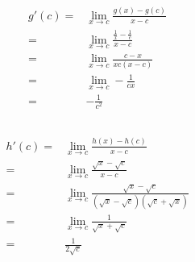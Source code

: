 \documentclass{article}
\begin{document}
        \subsection{}
            \paragraph{
                \begin{equation*}
                    \begin{split}
                        g'(c)=&\lim _{x\rightarrow c} \frac{g(x)-g(c)}{x-c}\\
                            =&\lim_{x\rightarrow c}\frac{\frac{1}{x}-\frac{1}{c}}{x-c}\\
                            =&\lim_{x\rightarrow c}\frac{c-x}{xc(x-c)}\\
                            =&\lim _{x\rightarrow c} -\frac{1}{cx}\\
                            =&-\frac{1}{c^2}
                    \end{split}
                \end{equation*}
            }
        \subsection{}
            \paragraph{
                \begin{equation*}
                    \begin{split}
                        h'(c)=&\lim _{x\rightarrow c} \frac{h(x)-h(c)}{x-c}\\
                            =&\lim_{x\rightarrow c}\frac{\sqrt{x}-\sqrt{c}}{x-c}\\
                            =&\lim_{x\rightarrow c}\frac{\sqrt{x}-\sqrt{c}}{(\sqrt{x}-\sqrt{c})(\sqrt{c}+\sqrt{x})}\\
                            =&\lim_{x\rightarrow c}\frac{1}{\sqrt{x}+\sqrt{c}}\\
                            =&\frac{1}{2\sqrt{c}}
                    \end{split}
                \end{equation*}
            }
        \subsection{}
\end{document}
